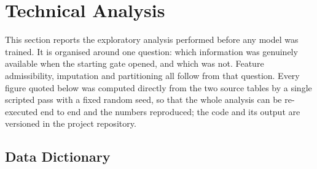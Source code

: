 %
%
%
%
%
%

\section{Technical Analysis}
\label{sec:analysis}

This section reports the exploratory analysis performed before any model
was trained. It is organised around one question: which information was
genuinely available when the starting gate opened, and which was not.
Feature admissibility, imputation and partitioning all follow from that
question. Every figure quoted below was computed directly from the two
source tables by a single scripted pass with a fixed random seed, so that
the whole analysis can be re-executed end to end and the numbers
reproduced; the code and its output are versioned in the project
repository.

\subsection{Data Dictionary}
\label{sec:dict}

